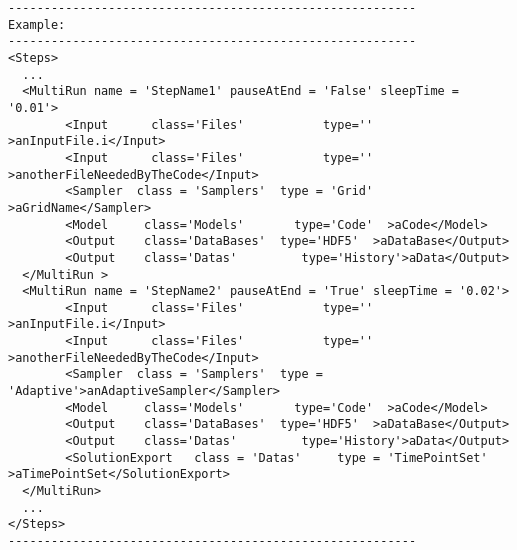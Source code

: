\begin{lstlisting}[style=XML]
---------------------------------------------------------
Example:
---------------------------------------------------------
<Steps>
  ...
  <MultiRun name = 'StepName1' pauseAtEnd = 'False' sleepTime = '0.01'>
        <Input      class='Files'           type=''          >anInputFile.i</Input>
        <Input      class='Files'           type=''          >anotherFileNeededByTheCode</Input>
        <Sampler  class = 'Samplers'  type = 'Grid' >aGridName</Sampler>
        <Model     class='Models'       type='Code'  >aCode</Model>
        <Output    class='DataBases'  type='HDF5'  >aDataBase</Output>
        <Output    class='Datas'         type='History'>aData</Output>
  </MultiRun >
  <MultiRun name = 'StepName2' pauseAtEnd = 'True' sleepTime = '0.02'>
        <Input      class='Files'           type=''          >anInputFile.i</Input>
        <Input      class='Files'           type=''          >anotherFileNeededByTheCode</Input>
        <Sampler  class = 'Samplers'  type = 'Adaptive'>anAdaptiveSampler</Sampler>
        <Model     class='Models'       type='Code'  >aCode</Model>
        <Output    class='DataBases'  type='HDF5'  >aDataBase</Output>
        <Output    class='Datas'         type='History'>aData</Output>
        <SolutionExport   class = 'Datas'     type = 'TimePointSet'  >aTimePointSet</SolutionExport>
  </MultiRun>
  ...
</Steps>
---------------------------------------------------------
\end{lstlisting}

